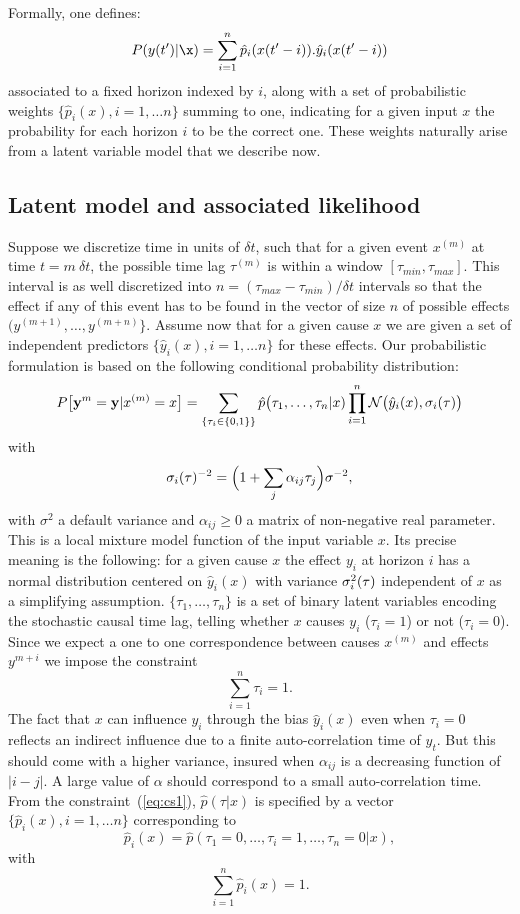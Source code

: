 Formally, one defines:
\[ P(y(t') | \x) = \sum_{i=1}^n \hat p_i(x(t'-i)). \hat y_i(x(t'-i)) \] 
associated to a fixed horizon indexed by $i$, along with a set
of probabilistic weights $\{\hat p_i(x),i=1,\ldots n\}$ summing to one, indicating for a given input $x$ the probability for each horizon $i$
to be the correct one. These weights naturally arise from a latent variable model that we describe now.

\subsection{Latent model and associated likelihood}\label{sec:latent}

Suppose we discretize time in units of $\delta t$, such that for a given event $x^{(m)}$ at time  
$t = m\ \delta t$, the possible time lag $\tau^{(m)}$ is within a window $[\tau_{min},\tau_{max}]$. 
This interval is as well discretized into $n = (\tau_{max}-\tau_{min})/\delta t $ intervals so that 
the effect if any of this event has to be found in the vector of size $n$ of possible effects $(y^{(m+1)},\ldots,y^{(m+n)}\}$.
Assume now that for a given cause $x$ we are given a set of independent predictors $\{\hat y_i(x),i=1,\ldots n\}$ for these effects.
Our probabilistic formulation is based on the following conditional probability distribution:
\begin{equation}\label{eq:py}
  P\bigl[{\bf y}^{m} = {\bf y}\vert x^{(m)}=x\bigr] = \sum_{\{\tau_i\in\{0,1\}\}}  \hat p\bigl(\tau_1,\ldots,\tau_n\vert x)
\prod_{i=1}^n {\cal N}\bigl(\hat y_i(x),\sigma_i(\tau)\bigr)
\end{equation}
with 
\[
\sigma_i({\bf \tau})^{-2} = \Bigl(1+\sum_j\alpha_{ij} \tau_j\Bigr)\sigma^{-2},
\]
with $\sigma^2$ a default variance and $\alpha_{ij}\ge 0$ a matrix of non-negative real parameter. 
This is a local mixture model function of the input variable $x$. Its precise meaning is the following: for a given cause $x$ the effect
$y_i$ at horizon $i$ has a normal distribution centered on $\hat y_i(x)$ with  variance $\sigma_i^2({\bf \tau})$ independent of $x$ as a simplifying assumption. $\{\tau_1,\ldots,\tau_n\}$ is a set of binary
latent variables encoding the stochastic causal time lag, telling whether $x$ causes $y_i$ ($\tau_i=1$) or not ($\tau_i=0$). Since we expect a one to one correspondence between causes
$x^{(m)}$ and effects $y^{m+i}$ we impose the constraint
\begin{equation}\label{eq:cs1}
\sum_{i=1}^n \tau_i = 1.
\end{equation}
The fact that $x$ can influence $y_i$ through the bias $\hat y_i(x)$ even when $\tau_i=0$ reflects an indirect
influence due to a finite auto-correlation time of $y_t$. But this should come with a higher variance, insured when $\alpha_{ij}$ is a decreasing function of $\vert i-j\vert$.
A large value of $\alpha$ should correspond to a small auto-correlation time. From the constraint~(\ref{eq:cs1}), $\hat p(\tau\vert x)$ is specified by  a vector
$\{\hat p_i(x),i=1,\dots n\}$ corresponding to
\[
\hat p_i(x) = \hat p(\tau_1=0,\ldots,\tau_i=1,\ldots,\tau_n=0\vert x),
\]
with 
\[
\sum_{i=1}^n \hat p_i(x) = 1.
\]
